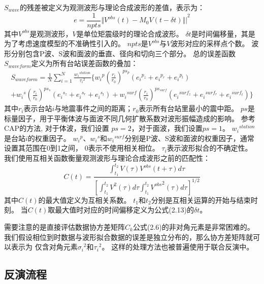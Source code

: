$S_{wave}$的残差被定义为观测波形与理论合成波形的差值，表示为：
\begin{equation}
    e = \frac{1}{npts}  {\Vert V^{obs}(t) - M_0 V(t-\delta t) \Vert|}^2 
\end{equation}
其中$V^{obs}$是观测波形，$V$是单位矩震级时的理论合成波形。
$\delta t$是时间偏移量，其是为了考虑速度模型的不准确性引入的。
$npts$是$V^{obs}$与$V$波形对应的采样点个数。
波形分别包含P波、S波和面波的垂直、径向和切向三个部分。
总的误差函数$S_{waveform}$定义为所有台站误差函数的叠加：
\begin{multline}
    S_{waveform} = \frac{1}{N} \sum_{i=1}^N \frac{{w_i}^{station}}{{\tau_i}^2} \biggl\{  
         {w_i}^p {(\frac{r_i}{r_0})}^{ps_p} ({e_i}^{p_z}+{e_i}^{p_r}+{e_i}^{p_t}) \\
        + {w_i}^s {(\frac{r_i}{r_0})}^{ps_s} ({e_i}^{s_z}+{e_i}^{s_r}+{e_i}^{s_t}) 
        + {w_i}^{surf} {(\frac{r_i}{r_0})}^{ps_{surf}} ({e_i}^{surf_z}+{e_i}^{surf_r}+{e_i}^{surf_t}) 
        \biggr\} 
    \label{equ:misfit-function-2}
\end{multline}
其中$r_i$表示台站$i$与地震事件之间的距离；$r_0$表示所有台站里最小的震中距。
$ps$是标量因子，用于平衡体波与面波不同几何扩散系数对波形振幅造成的影响。
参考CAP的方法\citep{Zhao1994,Zhu1996},
对于体波，我们设置 $ps = 2$，对于面波，我们设置$ps = 1$。
${w_i}^{station}$是台站$i$的权重因子。
${w_i}^p$、${w_i}^s$和${w_i}^{surf}$分别是P波、S波和面波的权重因子，通常设置其范围在0到1之间，
0表示不使用相关相位。
$\tau_i$表示波形拟合的不确定性。
我们使用互相关函数衡量观测波形与理论合成波形之前的匹配性：
\begin{equation}
    C(t) = \frac{\int_{t_1}^{t_2} V(\tau) V^{obs}(t+\tau) d\tau}
    {{ \left[ \int_{t_1}^{t_2} V^2(\tau) d\tau \int_{t_1}^{t_2} {V^{obs}}^2(\tau) d\tau \right] }^{1/2}    }
\end{equation}
其中$C(t)$的最大值定义为互相关系数。
$t_1$和$t_2$分别是互相关运算的开始与结束时刻。
当$C(t)$取最大值时对应的时间偏移定义为公式(2.13)的$\delta t$。

需要注意的是直接评估数据协方差矩阵$C_k$公式(2.6)的非对角元素是非常困难的。
我们假设相位到时数据与波形拟合数据的误差是独立分布的，那么协方差矩阵就可以表示为
仅含对角元素${\sigma_i}^2$和${\tau_i}^2$。
这样的处理方法也被普遍使用于联合反演中\citep{Shen2013,Fang2016}。



\subsection{反演流程}

